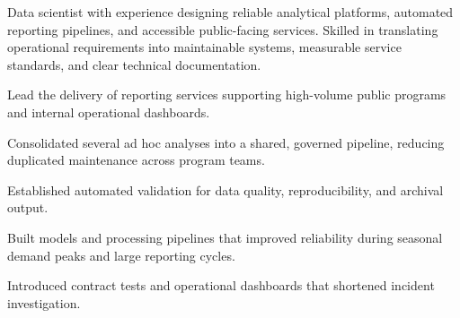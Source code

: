 \documentclass[fontsize=11pt, margin=narrow]{careerdossier-resume}
\begin{document}
\MakeCDossierHeader


Data scientist with experience designing reliable analytical platforms,
automated reporting pipelines, and accessible public-facing services. Skilled in
translating operational requirements into maintainable systems, measurable
service standards, and clear technical documentation.



\begin{CDossierEntry}[
  title        = {Senior Data Scientist},
  organization = {Government Digital Services Laboratory},
  location     = {Ottawa, ON / Remote},
  dates        = {2024--Present}
]
  \begin{CDossierItemize}
    \item Lead the delivery of reporting services supporting high-volume public
          programs and internal operational dashboards.
    \item Consolidated several ad hoc analyses into a shared, governed pipeline,
          reducing duplicated maintenance across program teams.
    \item Established automated validation for data quality, reproducibility, and
          archival output.
  \end{CDossierItemize}
\end{CDossierEntry}


\begin{CDossierEntry}[
  title        = {Data Scientist},
  organization = {Civic Technology Research Group},
  location     = {Toronto, ON},
  dates        = {2021--2024}
]
  \begin{CDossierItemize}
    \item Built models and processing pipelines that improved reliability during
          seasonal demand peaks and large reporting cycles.
    \item Introduced contract tests and operational dashboards that shortened
          incident investigation.
  \end{CDossierItemize}
\end{CDossierEntry}
\end{document}
